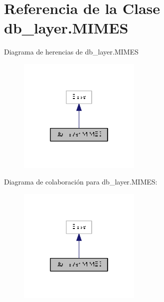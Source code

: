 \hypertarget{classdb__layer_1_1_m_i_m_e_s}{\section{Referencia de la Clase db\-\_\-layer.\-M\-I\-M\-E\-S}
\label{classdb__layer_1_1_m_i_m_e_s}
}


Diagrama de herencias de db\-\_\-layer.\-M\-I\-M\-E\-S\nopagebreak
\begin{figure}[H]
\begin{center}
\leavevmode
\includegraphics[width=166pt]{classdb__layer_1_1_m_i_m_e_s__inherit__graph}
\end{center}
\end{figure}


Diagrama de colaboración para db\-\_\-layer.\-M\-I\-M\-E\-S\-:\nopagebreak
\begin{figure}[H]
\begin{center}
\leavevmode
\includegraphics[width=166pt]{classdb__layer_1_1_m_i_m_e_s__coll__graph}
\end{center}
\end{figure}

